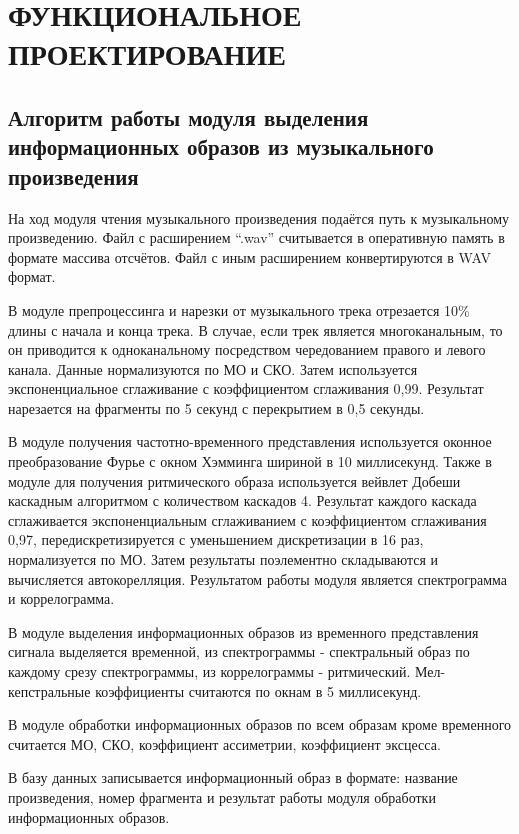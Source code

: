 \section{ФУНКЦИОНАЛЬНОЕ ПРОЕКТИРОВАНИЕ}
\label{sec:func}


\subsection{Алгоритм работы модуля выделения информационных образов из музыкального произведения}
    
На ход модуля чтения музыкального произведения подаётся путь к музыкальному произведению. Файл с расширением “.wav” считывается в оперативную память в формате массива отсчётов. Файл с иным расширением конвертируются в WAV формат. 

В модуле препроцессинга и нарезки от музыкального трека отрезается 10\% длины с начала и конца трека. В случае, если трек является многоканальным, то он приводится к одноканальному посредством чередованием правого и левого канала. Данные нормализуются по МО и СКО. Затем используется экспоненциальное сглаживание с коэффициентом сглаживания 0,99. Результат нарезается на фрагменты по 5 секунд с перекрытием в 0,5 секунды.

В модуле получения частотно-временного представления используется оконное преобразование Фурье с окном Хэмминга шириной в 10 миллисекунд. Также в модуле для получения ритмического образа используется вейвлет Добеши каскадным алгоритмом с количеством каскадов 4. Результат каждого каскада сглаживается экспоненциальным сглаживанием с коэффициентом сглаживания 0,97, передискретизируется с уменьшением дискретизации в 16 раз, нормализуется по МО. Затем результаты поэлементно складываются и вычисляется автокорелляция. Результатом работы модуля является спектрограмма и коррелограмма.

В модуле выделения информационных образов из временного представления сигнала выделяется временной, из спектрограммы - спектральный образ по каждому срезу спектрограммы, из коррелограммы - ритмический. Мел-кепстральные коэффициенты считаются по окнам в 5 миллисекунд. 

В модуле обработки информационных образов по всем образам кроме временного считается МО, СКО, коэффициент ассиметрии, коэффициент эксцесса.

В базу данных записывается информационный образ в формате: название произведения, номер фрагмента и результат работы модуля обработки информационных образов.  

